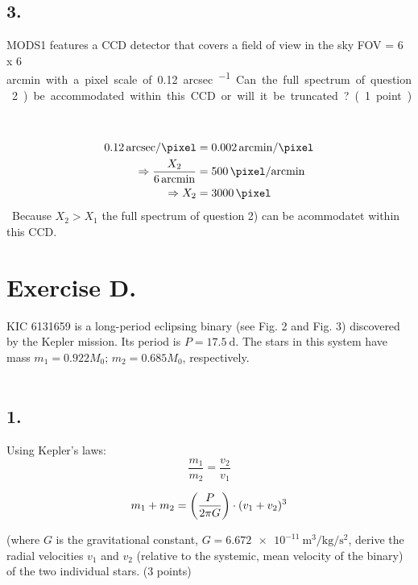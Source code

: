 \documentclass[11pt,a4paper,twoside]{article}
\begin{document}
\subsection*{3.} MODS1 features a CCD detector that covers a field of view in the sky FOV = 6 x 6 
\si{arcmin\square} with a pixel scale of \SI{0.12}{arcsec\per\pixel}. Can the full spectrum of question 2)  be accommodated within this CCD or will it be truncated? (1 point)\\

\begin{eqnarray}
\SI{0.12}{arcsec\per\pixel} & = \SI{0.002}{arcmin\per\pixel}\\
\Rightarrow \frac{X_2}{\SI{6}{arcmin}}&=\SI{500}{\pixel\per arcmin}\\
\Rightarrow X_2&=\SI{3000}{\pixel}
\end{eqnarray}
Because $X_2>X_1$ the full spectrum of question 2) can be acommodatet within this CCD.

\section*{Exercise D.}
KIC 6131659 is a long-period eclipsing binary (see Fig. 2 and Fig. 3) 
discovered by the Kepler mission. Its period is $P = \SI{17.5}{\day}$. The stars in this system 
have mass $m_1 = \num{0.922} M_0$; $m_2 = \num{0.685} M_0$, respectively.\\
\\
\subsection*{1.} Using Kepler's laws:
\begin{equation}
 \frac{m_1}{m_2}=\frac{v_2}{v_1}
\end{equation}

\begin{equation}
 m_1 + m_2 = \left( \frac{P}{2 \pi G} \right) \cdot (v_1 + v_2)^3\\
\end{equation}


(where $G$ is the gravitational constant, $G = \SI{6.672e-11}{\meter\cubed\per\kg\per\second\squared}$, derive the radial velocities $v_1$ and $v_2$ (relative to the systemic, mean velocity of the binary) of the two individual stars. (3 points)\\
\end{document}
